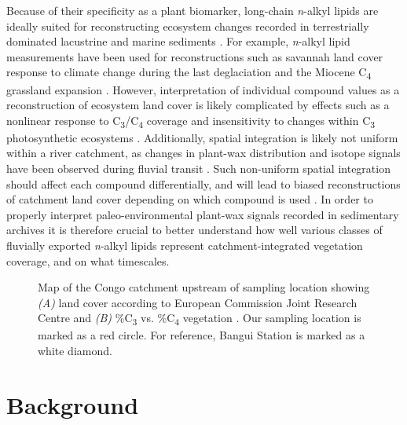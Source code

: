 Because of their specificity as a plant biomarker, long-chain \textit{n}-alkyl lipids are ideally suited for reconstructing ecosystem changes recorded in terrestrially dominated lacustrine and marine sediments \citep{Pancost:2004ij,Eglinton:2008hs,Castaneda:2011jb,Freeman:2014gi}. For example, \textit{n}-alkyl lipid  measurements have been used for reconstructions such as savannah land cover response to climate change during the last deglaciation\citep{Hughen:2004gc} and the Miocene C\textsubscript{4} grassland expansion \citep{Freeman:2001tv,Hoetzel:2013hj}. However, interpretation of individual compound  values as a reconstruction of ecosystem land cover is likely complicated by effects such as a nonlinear response to C\textsubscript{3}/C\textsubscript{4} coverage \citep{Garcin:2014hg} and insensitivity to changes within C\textsubscript{3} photosynthetic ecosystems \citep[\textit{\textit{i.e.}} woody vs. non-woody][]{Feakins:2013ks,Magill:2013ab,Magill:2013cz}. Additionally, spatial integration is likely not uniform within a river catchment, as changes in plant-wax distribution and isotope signals have been observed during fluvial transit \citep{Galy:2011hk,Galy:2011ix,Ponton:2014jr}. Such non-uniform spatial integration should affect each compound differentially, and will lead to biased reconstructions of catchment land cover depending on which compound is used \citep[\textit{e.g.}][]{Wang:2013jz}. In order to properly interpret paleo-environmental plant-wax signals recorded in sedimentary archives it is therefore crucial to better understand how well various classes of fluvially exported \textit{n}-alkyl lipids represent catchment-integrated vegetation coverage, and on what timescales.

\begin{figure}[t]
	\caption[Congo catchment map showing land cover and \%C\textsubscript{3} vs. \%C\textsubscript{4} vegetation]{Map of the Congo catchment upstream of sampling location showing \textit{(A)} land cover according to European Commission Joint Research Centre \citep{Mayaux:2004uw} and \textit{(B)} \%C\textsubscript{3} vs. \%C\textsubscript{4} vegetation \citep{Still:2010wh}. Our sampling location is marked as a red circle. For reference, Bangui Station \citep{Coynel:2005cn,Bouillon:2012cw,Bouillon:2014ko} is marked as a white diamond.}
	\label{Ch4Fig:1} 
\end{figure}

\section{Background}

